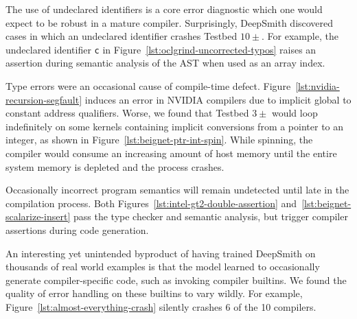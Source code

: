 
The use of undeclared identifiers is a core error diagnostic which one would expect to be robust in a mature compiler. Surprisingly, DeepSmith discovered cases in which an undeclared identifier crashes Testbed $10\pm$. For example, the undeclared identifier \texttt{c} in Figure~\ref{lst:oclgrind-uncorrected-typos} raises an assertion during semantic analysis of the AST when used as an array index.

Type errors were an occasional cause of compile-time defect. Figure~\ref{lst:nvidia-recursion-segfault} induces an error in NVIDIA compilers due to implicit global to constant address qualifiers. Worse, we found that Testbed $3\pm$ would loop indefinitely on some kernels containing implicit conversions from a pointer to an integer, as shown in Figure~\ref{lst:beignet-ptr-int-spin}. While spinning, the compiler would consume an increasing amount of host memory until the entire system memory is depleted and the process crashes. %

Occasionally incorrect program semantics will remain undetected until late in the compilation process. Both Figures~\ref{lst:intel-gt2-double-assertion} and~\ref{lst:beignet-scalarize-insert} pass the type checker and semantic analysis, but trigger compiler assertions during code generation.

An interesting yet unintended byproduct of having trained DeepSmith on thousands of real world examples is that the model learned to occasionally generate compiler-specific code, such as invoking compiler builtins. We found the quality of error handling on these builtins to vary wildly. For example, Figure~\ref{lst:almost-everything-crash} silently crashes 6 of the 10 compilers.


